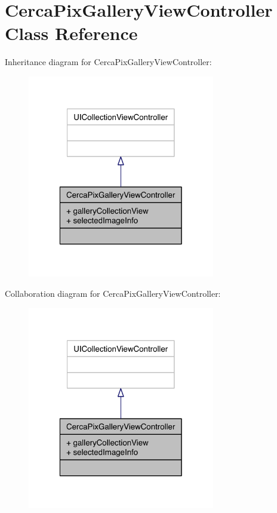 \hypertarget{interface_cerca_pix_gallery_view_controller}{\section{Cerca\-Pix\-Gallery\-View\-Controller Class Reference}
\label{interface_cerca_pix_gallery_view_controller}
}


Inheritance diagram for Cerca\-Pix\-Gallery\-View\-Controller\-:\nopagebreak
\begin{figure}[H]
\begin{center}
\leavevmode
\includegraphics[width=232pt]{interface_cerca_pix_gallery_view_controller__inherit__graph}
\end{center}
\end{figure}


Collaboration diagram for Cerca\-Pix\-Gallery\-View\-Controller\-:\nopagebreak
\begin{figure}[H]
\begin{center}
\leavevmode
\includegraphics[width=232pt]{interface_cerca_pix_gallery_view_controller__coll__graph}
\end{center}
\end{figure}
